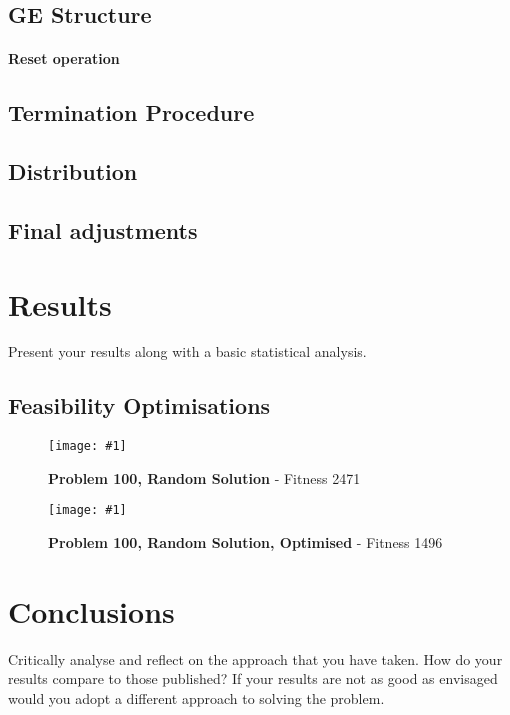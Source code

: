 \documentclass[14pt]{acmsiggraph}
\newcommand{\figuremacroW}[4]{
	\begin{figure}[h] %
		\centering
		\texttt{[image: \#1]}
		\caption[#2]{\textbf{#2} - #3}
		\label{fig:#1}
	\end{figure}
}
\begin{document}
\subsection{GE Structure}
\lipsum[7]
\paragraph{Reset operation}
\lipsum[7]
\subsection{Termination Procedure}
\lipsum[7]
\subsection{Distribution}
\lipsum[7]
\subsection{Final adjustments}
\lipsum[7]

\section{Results}
Present your results along with a basic statistical analysis.

\subsection{Feasibility Optimisations}
\figuremacroW
{p100rnd}
{Problem 100, Random Solution}
{Fitness 2471}
{1.0}
\figuremacroW
{p100rndopt}
{Problem 100, Random Solution, Optimised}
{Fitness 1496}
{1.0}


\lipsum[7]
\section{Conclusions}
Critically analyse and reflect on the approach that you have taken. How do your results compare to those published? If your results are not as good as envisaged would you adopt a different approach to solving the problem.

\lipsum[7]



\end{document}
